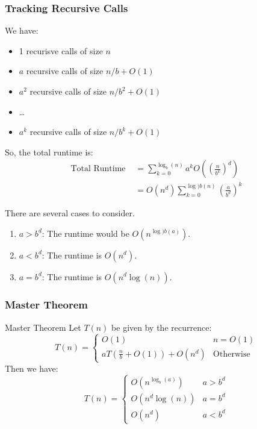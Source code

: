 \documentclass[letterpaper]{article}
\begin{document}
\subsubsection{Tracking Recursive Calls}
We have: 
\begin{itemize}
    \item 1 recurisve calls of size $n$
    \item $a$ recursive calls of size $n / b + O(1)$
    \item $a^2$ recursive calls of size $n / b^2 + O(1)$
    \item \dots
    \item $a^k$ recursive calls of size $n / b^k + O(1)$
\end{itemize}
So, the total runtime is: 
\begin{equation*}
    \begin{aligned}
        \text{Total Runtime } &= \sum_{k = 0}^{\log_{b}(n)} a^k O\left(\left(\frac{n}{b^k}\right)^d\right) \\ 
            &= O(n^d) \sum_{k = 0}^{\log){b}(n)} \left(\frac{a}{b^d}\right)^k
    \end{aligned}
\end{equation*}

There are several cases to consider. 
\begin{enumerate}
    \item $a > b^d$: The runtime would be $O(n^{\log){b}(a)})$.
    \item $a < b^d$: The runtime is $O(n^d)$. 
    \item $a = b^d$: The runtime is $O(n^d \log(n))$. 
\end{enumerate}

\subsubsection{Master Theorem}
\begin{theorem}{Master Theorem}{}
    Let $T(n)$ be given by the recurrence:
    \[T(n) = \begin{cases}
        O(1) & n = O(1) \\ 
        aT\left(\frac{n}{b} + O(1)\right) + O(n^d) & \text{Otherwise}
    \end{cases}\]
    Then we have: 
    \[T(n) = \begin{cases}
        O(n^{\log_{b}(a)}) & a > b^d \\ 
        O(n^d \log(n)) & a = b^d \\ 
        O(n^d) & a < b^d
    \end{cases}\]
\end{theorem}
\end{document}
